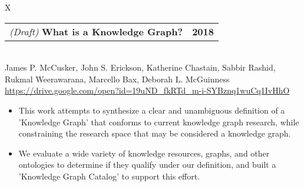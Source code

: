 \documentclass[10pt]{article}
\newcommand{\tabularxwidth}{\textwidth}
\begin{document}
        \begin{minipage}{\tabularxwidth}
        \begin{tabularx}{\tabularxwidth}{X}
            {
                \begin{tabularx}{\tabularxwidth}{@{}X r}
                        \textit{(Draft) }
                    \textbf{What is a Knowledge Graph?} &
                    \textbf{
        2018} \\
                \end{tabularx}
            } \\
            James P. McCusker, John S. Erickson, Katherine Chastain, Sabbir Rashid, Rukmal Weerawarana, Marcello Bax, Deborah L. McGuinness \\

            
            
                \url{https://drive.google.com/open?id=19uND_fkRTd_m-i-SYBznq1wuCq1IvHhO} \\
            
            
        \end{tabularx}

        \begin{itemize}[noitemsep, topsep=3pt, parsep=0pt, partopsep=0pt]
            
                \item 
    This work attempts to synthesize a clear and unambiguous definition of a 'Knowledge Graph' that conforms to current knowledge graph research, while constraining the research space that may be considered a knowledge graph.
            
                \item 
    We evaluate a wide variety of knowledge resources, graphs, and other ontologies to determine if they qualify under our definition, and built a 'Knowledge Graph Catalog' to support this effort.
            
        \end{itemize}

        

        \end{minipage}
    
\end{document}
